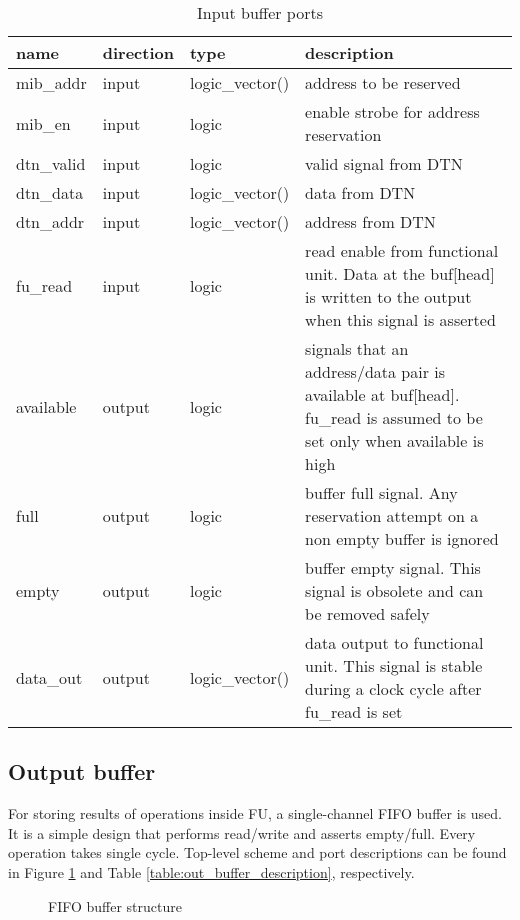 	\begin{table}[!htb]
		\begin{tabular}{| l| l | l | p{8cm} |}
			\hline
			\textbf{name} & \textbf{direction} & \textbf{type} &  \textbf{description}\\ \hline
			mib\_addr & input & logic\_vector(\addrW) & address to be reserved \\ \hline
			mib\_en & input & logic & enable strobe for address reservation \\ \hline
			dtn\_valid & input & logic & valid signal from DTN \\ \hline
			dtn\_data & input & logic\_vector(\dataW) & data from DTN \\ \hline
			dtn\_addr & input & logic\_vector(\addrW) & address from DTN \\ \hline
			fu\_read & input & logic & read enable from functional unit. Data at the buf[head] is written to the output when this signal is asserted \\ \hline
			available & output & logic & signals that an address/data pair is available at buf[head]. fu\_read is assumed to be set only when available is high \\ \hline
			full & output & logic & buffer full signal. Any reservation attempt on a non empty buffer is ignored \\ \hline
			empty & output & logic & buffer empty signal. This signal is obsolete and can be removed safely \\ \hline
			data\_out & output & logic\_vector(\dataW) & data output to functional unit. This signal is stable during a clock cycle after fu\_read is set \\ \hline
		\end{tabular}
		
		\caption{Input buffer ports \label{table:in_buffer_description}}
		\centering
	\end{table}
	
	\FloatBarrier
	\subsection{Output buffer}
	For storing results of operations inside FU, a single-channel FIFO buffer is used. It is a simple design that performs read/write and asserts empty/full. Every operation takes single cycle. Top-level scheme and port descriptions can be found in Figure \ref{fig:output_buffer} and Table \ref{table:out_buffer_description}, respectively.
	\begin{figure}[htbp]
		\centering
		\def\svgscale{0.5}
		
		\caption{FIFO buffer structure}
		\label{fig:output_buffer} 
	\end{figure}
	
